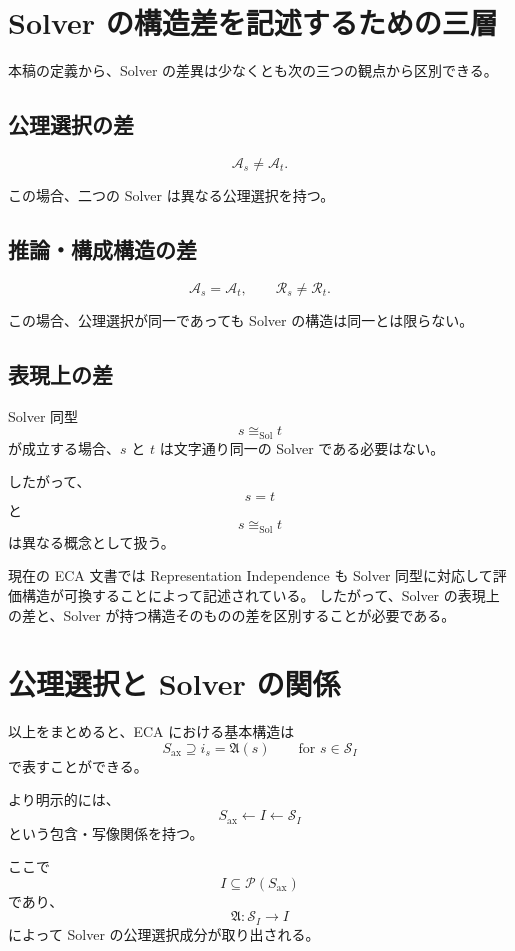 \documentclass[a4paper,11pt]{jsarticle}
\newcommand{\Solver}{\mathcal{S}}
\newcommand{\Ax}{S_{\mathrm{ax}}}
\newcommand{\Sel}{I}
\begin{document}
\section{Solver の構造差を記述するための三層}

本稿の定義から、Solver の差異は少なくとも次の三つの観点から区別できる。

\subsection{公理選択の差}

\[
\mathcal{A}_s\neq\mathcal{A}_t.
\]

この場合、二つの Solver は異なる公理選択を持つ。

\subsection{推論・構成構造の差}

\[
\mathcal{A}_s=\mathcal{A}_t,
\qquad
\mathcal{R}_s\neq\mathcal{R}_t.
\]

この場合、公理選択が同一であっても Solver の構造は同一とは限らない。

\subsection{表現上の差}

Solver 同型
\[
s\cong_{\mathrm{Sol}}t
\]
が成立する場合、$s$ と $t$ は文字通り同一の Solver である必要はない。

したがって、
\[
s=t
\]
と
\[
s\cong_{\mathrm{Sol}}t
\]
は異なる概念として扱う。

現在の ECA 文書では Representation Independence も Solver 同型に対応して評価構造が可換することによって記述されている。
したがって、Solver の表現上の差と、Solver が持つ構造そのものの差を区別することが必要である。

\section{公理選択と Solver の関係}

以上をまとめると、ECA における基本構造は
\[
\boxed{
\Ax
\supseteq
i_s=\mathfrak{A}(s)
\qquad
\text{for }s\in\Solver_{\Sel}
}
\]
で表すことができる。

より明示的には、
\[
\boxed{
\Ax
\longleftarrow
\Sel
\longleftarrow
\Solver_{\Sel}
}
\]
という包含・写像関係を持つ。

ここで
\[
\Sel\subseteq\mathcal{P}(\Ax)
\]
であり、
\[
\mathfrak{A}:\Solver_{\Sel}\to\Sel
\]
によって Solver の公理選択成分が取り出される。
\end{document}
